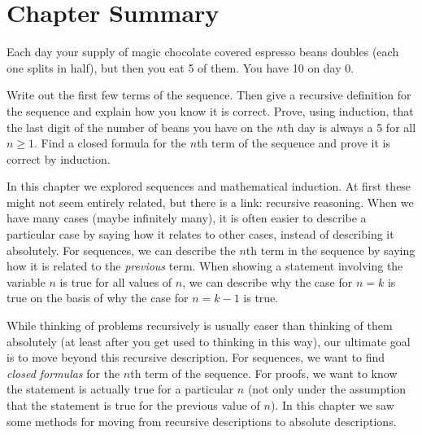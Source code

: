 \documentclass[12pt]{article}
\begin{document}
\section{Chapter Summary}

\begin{activity}
Each day your supply of magic chocolate covered espresso beans doubles (each one splits in half), but then you eat 5 of them.  You have 10 on day 0. 

\begin{questions}
\question Write out the first few terms of the sequence.  Then give a recursive definition for the sequence and explain how you know it is correct.  
\question Prove, using induction, that the last digit of the number of beans you have on the $n$th day is always a 5 for all $n \ge 1$.
\question Find a closed formula for the $n$th term of the sequence and prove it is correct by induction.
\end{questions}

\end{activity}

In this chapter we explored sequences and mathematical induction.  At first these might not seem entirely related, but there is a link: recursive reasoning.  When we have many cases (maybe infinitely many), it is often easier to describe a particular case by saying how it relates to other cases, instead of describing it absolutely.  For sequences, we can describe the $n$th term in the sequence by saying how it is related to the \emph{previous} term.  When showing a statement involving the variable $n$ is true for all values of $n$, we can describe why the case for $n = k$ is true on the basis of why the case for $n = k-1$ is true.  

While thinking of problems recursively is usually easer than thinking of them absolutely (at least after you get used to thinking in this way), our ultimate goal is to move beyond this recursive description.  For sequences, we want to find \emph{closed formulas} for the $n$th term of the sequence.  For proofs, we want to know the statement is actually true for a particular $n$ (not only under the assumption that the statement is true for the previous value of $n$). In this chapter we saw some methods for moving from recursive descriptions to absolute descriptions.
\end{document}

